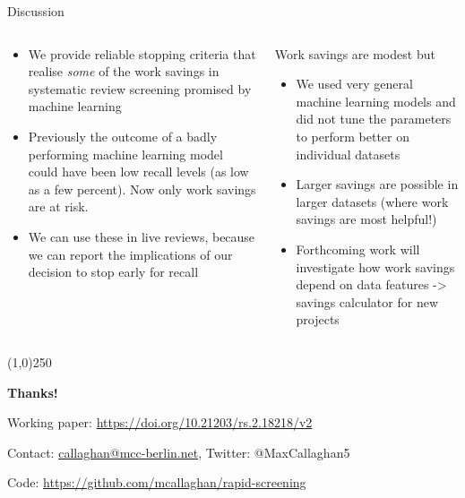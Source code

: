 \documentclass[9pt, aspectratio=169]{beamer}
\begin{document}
\begin{frame}{Discussion}

\begin{columns}
	\begin{column}{0.618\linewidth}
		 \begin{itemize}
		 	\item We provide reliable stopping criteria that realise \textit{some} of the work savings in systematic review screening promised by machine learning
		 	\item Previously the outcome of a badly performing machine learning model could have been low recall levels (as low as a few percent). Now only work savings are at risk.
		 	\item We can use these in live reviews, because we can report the implications of our decision to stop early for recall
		 \end{itemize}
	\end{column}
	\begin{column}{0.382\linewidth}
		Work savings are modest but
		\begin{itemize}
			\item We used very general machine learning models and did not tune the parameters to perform better on individual datasets
			\item Larger savings are possible in larger datasets (where work savings are most helpful!)
			\item Forthcoming work will investigate how work savings depend on data features -> savings calculator for new projects
		\end{itemize}
	\end{column}
\end{columns}

\begin{center}
	\line(1,0){250}
	
	\medskip
	
	\textbf{Thanks!}
	
	\medskip
	
	Working paper: \url{https://doi.org/10.21203/rs.2.18218/v2}
	
	Contact: \url{callaghan@mcc-berlin.net}, Twitter: @MaxCallaghan5
	
	Code: \url{https://github.com/mcallaghan/rapid-screening}
	
\end{center}

\end{frame}

\appendix
\backupbegin
\end{document}
